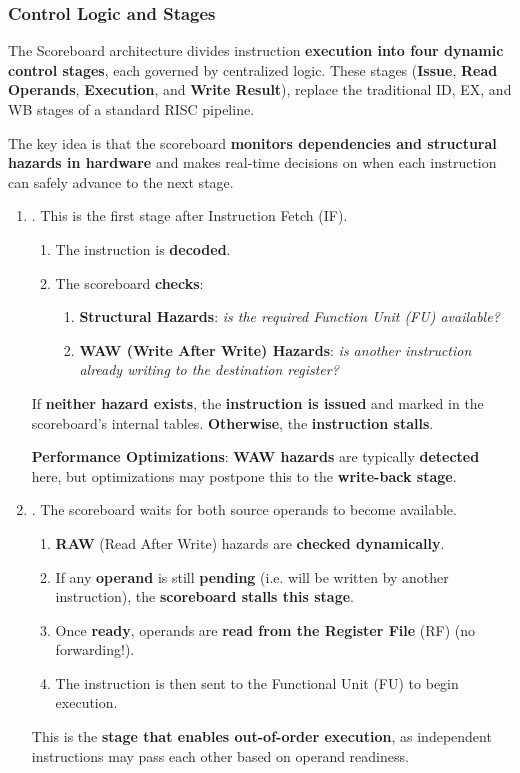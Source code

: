 \subsubsection{Control Logic and Stages}

The Scoreboard architecture divides instruction \textbf{execution into four dynamic control stages}, each governed by centralized logic. These stages (\textbf{Issue}, \textbf{Read Operands}, \textbf{Execution}, and \textbf{Write Result}), replace the traditional ID, EX, and WB stages of a standard RISC pipeline.

\highspace
The key idea is that the scoreboard \textbf{monitors dependencies and structural hazards in hardware} and makes real-time decisions on when each instruction can safely advance to the next stage.

\begin{enumerate}
    \item {}. This is the first stage after Instruction Fetch (IF).
    \begin{enumerate}
        \item The instruction is \textbf{decoded}.
        \item The scoreboard \textbf{checks}:
        \begin{enumerate}
            \item \textbf{Structural Hazards}: \emph{is the required Function Unit (FU) available?}
            \item \textbf{WAW (Write After Write) Hazards}: \emph{is another instruction already writing to the destination register?}
        \end{enumerate}
    \end{enumerate}
    If \textbf{neither hazard exists}, the \textbf{instruction is issued} and marked in the scoreboard's internal tables. \textbf{Otherwise}, the \textbf{instruction stalls}.

    \textcolor{Green3}{\faIcon{\speedIcon} \textbf{Performance Optimizations}}: \textbf{WAW hazards} are typically \textbf{detected} here, but optimizations may postpone this to the \textbf{write-back stage}.


    \item {}. The scoreboard waits for both source operands to become available.
    \begin{enumerate}
        \item \textbf{RAW} (Read After Write) hazards are \textbf{checked dynamically}.
        \item If any \textbf{operand} is still \textbf{pending} (i.e. will be written by another instruction), the \textbf{scoreboard stalls this stage}.
        \item Once \textbf{ready}, operands are \textbf{read from the Register File} (RF) (no forwarding!).
        \item The instruction is then sent to the Functional Unit (FU) to begin execution.
    \end{enumerate}
    This is the \textbf{stage that enables out-of-order execution}, as independent instructions may pass each other based on operand readiness.



\end{enumerate}
